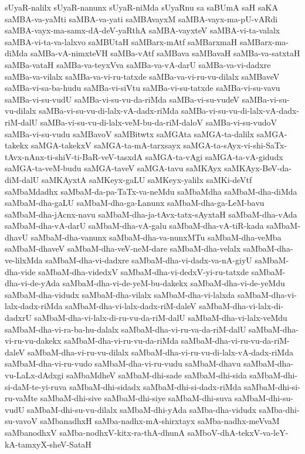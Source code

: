 {sUyaR-nalilx
sUyaR-nanunx
sUyaR-niMda
sUyaRnu
sa
saBUmA
saH
saKA
saMBA-va-yaMti
saMBA-va-yati
saMBAvayxM
saMBA-vayx-ma-pU-vARdi
saMBA-vayx-ma-samx-dA-deV-yaRthA
saMBA-vayxteV
saMBA-vi-ta-valalx
saMBA-vi-ta-va-lalxvo
saMBUtaH
saMBarx-mAtf
saMBarxmaH
saMBarx-ma-diMda
saMBa-vA-nimxteVH
saMBa-vAtf
saMBava
saMBavaH
saMBa-va-satxtaH
saMBa-vataH
saMBa-va-teyxVva
saMBa-va-vA-darU
saMBa-va-vi-dadxre
saMBa-va-vilalx
saMBa-va-vi-ru-tatxde
saMBa-va-vi-ru-vu-dilalx
saMBaveV
saMBa-vi-sa-ba-hudu
saMBa-vi-siVtu
saMBa-vi-su-tatxde
saMBa-vi-su-vavu
saMBa-vi-su-vudU
saMBa-vi-su-vu-da-riMda
saMBa-vi-su-vudeV
saMBa-vi-su-vu-dilalx
saMBa-vi-su-vu-di-lalx-vA-dadx-riMda
saMBa-vi-su-vu-di-lalx-vA-dadx-riM-dalU
saMBa-vi-su-vu-di-lalx-veM-bu-da-riM-daloV
saMBa-vi-su-vudoV
saMBa-vi-su-vudu
saMBavoV
saMBitwtx
saMGAta
saMGA-ta-dalilx
saMGA-takekx
saMGA-takekxV
saMGA-ta-mA-tarxsayx
saMGA-ta-sAyx-vi-shi-SaTx-tAvx-nAnx-ti-shiV-ti-BaR-veV-tasxdA
saMGA-ta-vAgi
saMGA-ta-vA-gidudx
saMGA-ta-veM-budu
saMGA-taveV
saMGA-tavu
saMKAyx
saMKAyx-BeV-da-diM-dalU
saMKAyxtA
saMKeyx-gaLU
saMKeyx-yalilx
saMKi-deVtf
saMbaMdadhx
saMbaM-da-pa-TaTx-va-neMdu
saMbaMdha
saMbaM-dha-diMda
saMbaM-dha-gaLU
saMbaM-dha-ga-Lanunx
saMbaM-dha-ga-LeM-bavu
saMbaM-dha-jAcnx-navu
saMbaM-dha-ja-tAvx-tatx-sAyxtaH
saMbaM-dha-vAda
saMbaM-dha-vA-darU
saMbaM-dha-vA-galu
saMbaM-dha-vA-tiR-kada
saMbaM-dhavU
saMbaM-dha-vanunx
saMbaM-dha-va-nunxMTu
saMbaM-dha-veMba
saMbaM-dhaveV
saMbaM-dha-veV-neM-dare
saMbaM-dha-velalx
saMbaM-dha-ve-lilxMda
saMbaM-dha-vi-dadxre
saMbaM-dha-vi-dadx-va-nA-giyU
saMbaM-dha-vide
saMbaM-dha-videdxV
saMbaM-dha-vi-dedxV-yi-ru-tatxde
saMbaM-dha-vi-de-yAda
saMbaM-dha-vi-de-yeM-bu-dakekx
saMbaM-dha-vi-de-yeMdu
saMbaM-dha-vidudx
saMbaM-dha-vilalx
saMbaM-dha-vi-lalxda
saMbaM-dha-vi-lalx-dadx-riMda
saMbaM-dha-vi-lalx-dadx-riM-daleV
saMbaM-dha-vi-lalx-di-dadxrU
saMbaM-dha-vi-lalx-di-ru-vu-da-riM-dalU
saMbaM-dha-vi-lalx-veMdu
saMbaM-dha-vi-ra-ba-hu-dalalx
saMbaM-dha-vi-ru-va-da-riM-dalU
saMbaM-dha-vi-ru-vu-dakekx
saMbaM-dha-vi-ru-vu-da-riMda
saMbaM-dha-vi-ru-vu-da-riM-daleV
saMbaM-dha-vi-ru-vu-dilalx
saMbaM-dha-vi-ru-vu-di-lalx-vA-dadx-riMda
saMbaM-dha-vi-ru-vudo
saMbaM-dha-vi-ru-vudu
saMbaM-dhavu
saMbaM-dha-vu-LaLx-dAdxgi
saMbaMdheV
saMbaM-dhi-sade
saMbaM-dhi-sida
saMbaM-dhi-si-daM-te-yi-ruva
saMbaM-dhi-sidadx
saMbaM-dhi-si-dadx-riMda
saMbaM-dhi-si-ru-vaMte
saMbaM-dhi-sive
saMbaM-dhi-siye
saMbaM-dhi-suva
saMbaM-dhi-su-vudU
saMbaM-dhi-su-vu-dilalx
saMbaM-dhi-yAda
saMba-dha-vidudx
saMba-dhi-su-vavoV
saMbanadhxH
saMba-nadhx-mA-shirxtayx
saMba-nadhx-meVvaM
saMbanodhxV
saMba-nodhxV-kitx-ra-thA-dhunA
saMboV-dhA-tekxV-va-leY-kA-tamxyX-sheV-SataH
}
